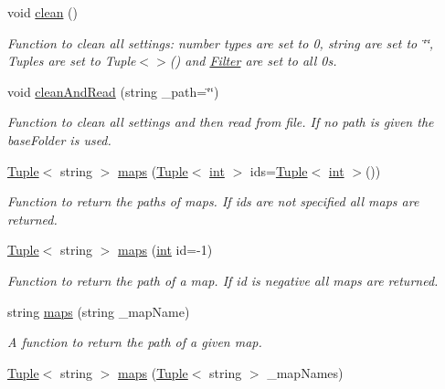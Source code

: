 \begin{DoxyCompactItemize}
void \mbox{\hyperlink{class_settings_a8ad60105ab9848720d05ebd19c5063f2}{clean}} ()
\begin{DoxyCompactList}\small\item\em Function to clean all settings\+: number types are set to 0, string are set to \char`\"{}\char`\"{}, Tuples are set to Tuple$<$$>$() and \mbox{\hyperlink{class_filter}{Filter}} are set to all 0s. \end{DoxyCompactList}\item 
void \mbox{\hyperlink{class_settings_acd13c0d603d94c7c2da58cd92bc955c8}{clean\+And\+Read}} (string \+\_\+path=\char`\"{}\char`\"{})
\begin{DoxyCompactList}\small\item\em Function to clean all settings and then read from file. If no path is given the base\+Folder is used. \end{DoxyCompactList}\item 
\mbox{\hyperlink{class_tuple}{Tuple}}$<$ string $>$ \mbox{\hyperlink{class_settings_aa924e455cc6ac356ba6a4c59ab09591c}{maps}} (\mbox{\hyperlink{class_tuple}{Tuple}}$<$ \mbox{\hyperlink{draw_8hh_aa620a13339ac3a1177c86edc549fda9b}{int}} $>$ ids=\mbox{\hyperlink{class_tuple}{Tuple}}$<$ \mbox{\hyperlink{draw_8hh_aa620a13339ac3a1177c86edc549fda9b}{int}} $>$())
\begin{DoxyCompactList}\small\item\em Function to return the paths of maps. If ids are not specified all maps are returned. \end{DoxyCompactList}\item 
\mbox{\hyperlink{class_tuple}{Tuple}}$<$ string $>$ \mbox{\hyperlink{class_settings_adc050f187f4040f5e897b2ff41caedd0}{maps}} (\mbox{\hyperlink{draw_8hh_aa620a13339ac3a1177c86edc549fda9b}{int}} id=-\/1)
\begin{DoxyCompactList}\small\item\em Function to return the path of a map. If id is negative all maps are returned. \end{DoxyCompactList}\item 
string \mbox{\hyperlink{class_settings_aa34e6004beffad1bc5fd81f99353d3e1}{maps}} (string \+\_\+map\+Name)
\begin{DoxyCompactList}\small\item\em A function to return the path of a given map. \end{DoxyCompactList}\item 
\mbox{\hyperlink{class_tuple}{Tuple}}$<$ string $>$ \mbox{\hyperlink{class_settings_ab638c9895f57ed5e8ab64084752c660d}{maps}} (\mbox{\hyperlink{class_tuple}{Tuple}}$<$ string $>$ \+\_\+map\+Names)

\end{DoxyCompactItemize}
